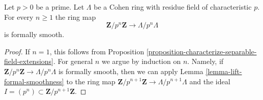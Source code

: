 \begin{lemma}
\label{lemma-cohen-ring-formally-smooth}
Let $p > 0$ be a prime.
Let $\Lambda$ be a Cohen ring with residue field of characteristic $p$.
For every $n \geq 1$ the ring map
$$
\mathbf{Z}/p^n\mathbf{Z} \to \Lambda/p^n\Lambda
$$
is formally smooth.
\end{lemma}

\begin{proof}
If $n = 1$, this follows from
Proposition \ref{proposition-characterize-separable-field-extensions}.
For general $n$ we argue by induction on $n$.
Namely, if $\mathbf{Z}/p^n\mathbf{Z} \to \Lambda/p^n\Lambda$ is
formally smooth, then we can apply Lemma \ref{lemma-lift-formal-smoothness}
to the ring map
$\mathbf{Z}/p^{n + 1}\mathbf{Z} \to \Lambda/p^{n + 1}\Lambda$
and the ideal $I = (p^n) \subset \mathbf{Z}/p^{n + 1}\mathbf{Z}$.
\end{proof}